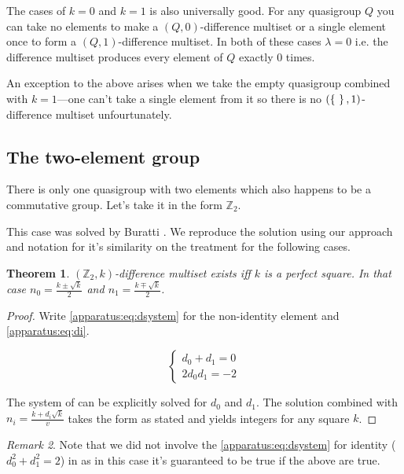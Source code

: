 \documentclass{article}
\theoremstyle{plain}
\newtheorem{theorem}{Theorem}[section]
\theoremstyle{definition}
\theoremstyle{remark}
\newtheorem{remark}[theorem]{Remark}
\begin{document}
			The cases of $k=0$ and $k=1$ is also universally good. For any quasigroup $Q$ you can take no elements to make a $(Q,0)$-difference multiset or a single element once to form a $(Q,1)$-difference multiset. In both of these cases $\lambda=0$ i.e. the difference multiset produces every element of $Q$ exactly $0$ times.
			
			An exception to the above arises when we take the empty quasigroup combined with $k=1$---one can't take a single element from it so there is no $(\set{}, 1)$-difference multiset unfourtunately.
			
		\subsection{The two-element group}
			There is only one quasigroup with two elements which also happens to be a commutative group. Let's take it in the form $\mathbb Z_2$.
		
			This case was solved by Buratti \cite{buratti1999old}. We reproduce the solution using our approach and notation for it's similarity on the treatment for the following cases.
			
			\begin{theorem}
				$(\mathbb Z_2,k)$-difference multiset exists iff $k$ is a perfect square. In that case $n_0 = \frac{k \pm \sqrt k}{2}$ and $n_1 = \frac{k \mp \sqrt k}{2}$.
			\end{theorem}
			\begin{proof}
				Write \eqref{apparatus:eq:dsystem} for the non-identity element and \eqref{apparatus:eq:di}.
				
				\begin{equation}
					\begin{cases}
						d_0 + d_1 = 0 \\
						2 d_0 d_1 = -2
					\end{cases}
				\end{equation}
				
				The system of can be explicitly solved for $d_0$ and $d_1$. The solution combined with $n_i = \frac{k + d_i \sqrt k}v$ takes the form as stated and yields integers for any square $k$.
			\end{proof}
			
			\begin{remark}
               Note that we did not involve the \eqref{apparatus:eq:dsystem} for identity ($d_0^2+d_1^2=2$) in as in this case it's guaranteed to be true if the above are true. 
			\end{remark}
			
\end{document}
